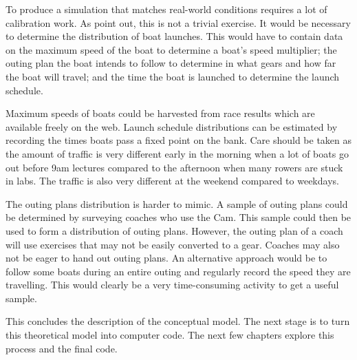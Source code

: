 To produce a simulation that matches real-world conditions requires a lot of calibration work. As \textcite{Lowry2011} point out, this is not a trivial exercise. It would be necessary to determine the distribution of boat launches. This would have to contain data on the maximum speed of the boat to determine a boat's speed multiplier; the outing plan the boat intends to follow to determine in what gears and how far the boat will travel; and the time the boat is launched to determine the launch schedule.

Maximum speeds of boats could be harvested from race results which are available freely on the web. Launch schedule distributions can be estimated by recording the times boats pass a fixed point on the bank. Care should be taken as the amount of traffic is very different early in the morning when a lot of boats go out before 9am lectures compared to the afternoon when many rowers are stuck in labs. The traffic is also very different at the weekend compared to weekdays.

The outing plans distribution is harder to mimic. A sample of outing plans could be determined by surveying coaches who use the Cam. This sample could then be used to form a distribution of outing plans. However, the outing plan of a coach will use exercises that may not be easily converted to a gear. Coaches may also not be eager to hand out outing plans. An alternative approach would be to follow some boats during an entire outing and regularly record the speed they are travelling. This would clearly be a very time-consuming activity to get a useful sample.

This concludes the description of the conceptual model. The next stage is to turn this theoretical model into computer code. The next few chapters explore this process and the final code.
